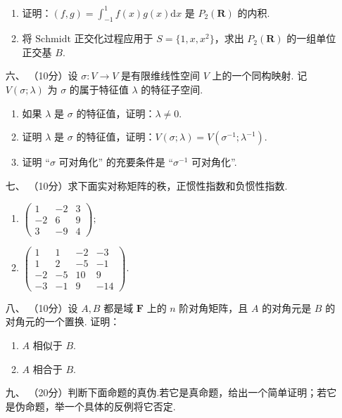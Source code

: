 \begin{enumerate}
    \begin{enumerate}[label=(\arabic*)]
        \item 证明：$(f,g)=\int_{-1}^1f(x)g(x)\mathrm{d}x$ 是 $P_2(\mathbf{R})$ 的内积.
        \item 将 $\mathrm{Schmidt}$ 正交化过程应用于 $S=\{1,x,x^2\}$，求出 $P_2(\mathbf{R})$ 的一组单位正交基 $B.$
    \end{enumerate}
    \item [六、]（10分）设 $\sigma:V\to V$ 是有限维线性空间 $V$ 上的一个同构映射. 记 $V(\sigma;\lambda)$ 为 $\sigma$ 的属于特征值 $\lambda$ 的特征子空间.
    \begin{enumerate}[label=(\arabic*)]
        \item 如果 $\lambda$ 是 $\sigma$ 的特征值，证明：$\lambda \neq 0.$
        \item 证明 $\lambda$ 是 $\sigma$ 的特征值，证明：$V(\sigma;\lambda)=V(\sigma^{-1};\lambda^{-1}).$
        \item 证明 ``$\sigma$ 可对角化'' 的充要条件是 ``$\sigma^{-1}$ 可对角化''.
    \end{enumerate}
    \item [七、]（10分）求下面实对称矩阵的秩，正惯性指数和负惯性指数.
    \begin{enumerate}[label=(\arabic*)]
        \item $\begin{pmatrix}1 & -2 & 3 \\ -2 & 6 & 9 \\ 3 & -9 & 4\end{pmatrix};$
        \item $\begin{pmatrix}1 & 1 & -2 & -3\\ 1 & 2 & -5 & -1 \\ -2 & -5 & 10 & 9 \\ -3 & -1 & 9 & -14\end{pmatrix}.$
    \end{enumerate}
    \item [八、]（10分）设 $A,B$ 都是域 $\mathbf{F}$ 上的 $n$ 阶对角矩阵，且 $A$ 的对角元是 $B$ 的对角元的一个置换. 证明：
    \begin{enumerate}[label=(\arabic*)]
        \item $A$ 相似于 $B.$
        \item $A$ 相合于 $B.$
    \end{enumerate}
    \item [九、]（20分）判断下面命题的真伪.若它是真命题，给出一个简单证明；若它是伪命题，举一个具体的反例将它否定.

\end{enumerate}
